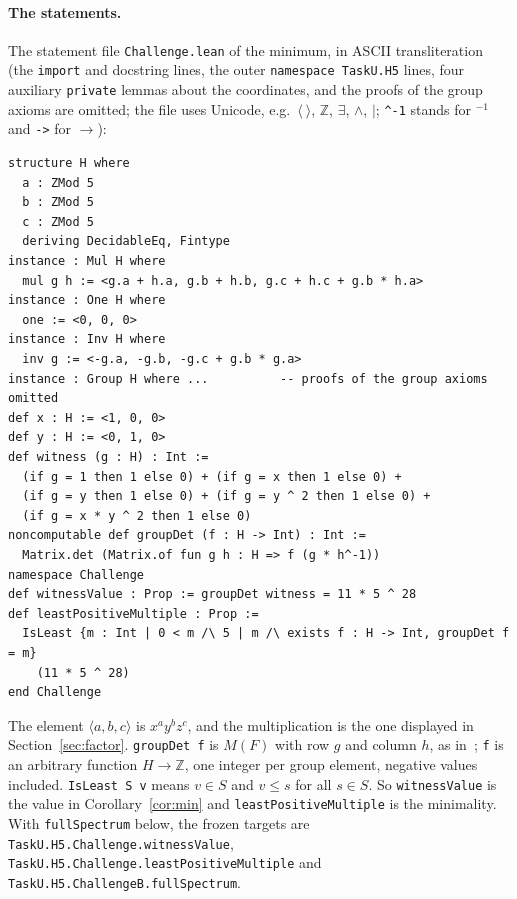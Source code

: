 \documentclass[11pt]{article}
\theoremstyle{definition}
\theoremstyle{remark}
\newcommand{\Z}{\mathbb Z}
\begin{document}
{\paragraph{The statements.} The statement file \texttt{Challenge.lean} of the
minimum, in ASCII transliteration (the \texttt{import} and docstring lines, the outer
\texttt{namespace TaskU.H5} lines, four auxiliary \texttt{private} lemmas about
the coordinates, and the proofs of the group axioms are omitted; the file uses
Unicode, e.g.\ $\langle\ \rangle$, $\mathbb Z$, $\exists$, $\wedge$, $\mid$;
\texttt{\^{}-1} stands for ${}^{-1}$ and \texttt{->} for $\to$):
{\footnotesize
\begin{verbatim}
structure H where
  a : ZMod 5
  b : ZMod 5
  c : ZMod 5
  deriving DecidableEq, Fintype
instance : Mul H where
  mul g h := <g.a + h.a, g.b + h.b, g.c + h.c + g.b * h.a>
instance : One H where
  one := <0, 0, 0>
instance : Inv H where
  inv g := <-g.a, -g.b, -g.c + g.b * g.a>
instance : Group H where ...          -- proofs of the group axioms omitted
def x : H := <1, 0, 0>
def y : H := <0, 1, 0>
def witness (g : H) : Int :=
  (if g = 1 then 1 else 0) + (if g = x then 1 else 0) +
  (if g = y then 1 else 0) + (if g = y ^ 2 then 1 else 0) +
  (if g = x * y ^ 2 then 1 else 0)
noncomputable def groupDet (f : H -> Int) : Int :=
  Matrix.det (Matrix.of fun g h : H => f (g * h^-1))
namespace Challenge
def witnessValue : Prop := groupDet witness = 11 * 5 ^ 28
def leastPositiveMultiple : Prop :=
  IsLeast {m : Int | 0 < m /\ 5 | m /\ exists f : H -> Int, groupDet f = m}
    (11 * 5 ^ 28)
end Challenge
\end{verbatim}}
\noindent The element $\langle a,b,c\rangle$ is $x^ay^bz^c$, and the
multiplication is the one displayed in Section~\ref{sec:factor}.
\texttt{groupDet f} is $M(F)$ with row $g$ and column $h$, as in~\cite[(1)]{mp};
\texttt{f} is an arbitrary function $H\to\Z$, one integer per group element,
negative values included. \texttt{IsLeast S v} means $v\in S$ and $v\le s$ for
all $s\in S$. So \texttt{witnessValue} is the value in Corollary~\ref{cor:min}
and \texttt{leastPositiveMultiple} is the minimality. With
\texttt{fullSpectrum} below, the frozen targets are
\texttt{TaskU.H5.Challenge.witnessValue},
\texttt{TaskU.H5.Challenge.leastPositiveMultiple} and
\texttt{TaskU.H5.ChallengeB.fullSpectrum}.

}
\end{document}
